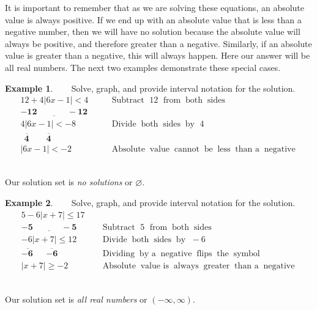 \documentclass[12pt]{book}
\theoremstyle{definition}
\newtheorem{example}{Example}
\newcommand{\tmmathbf}[1]{\ensuremath{\boldsymbol{#1}}}
\newcommand{\tmop}[1]{\ensuremath{\operatorname{#1}}}
\begin{document}
It is important to remember that as we are solving these equations, an absolute value is always positive. If we end up with an absolute value that is less than a negative number, then we will have no solution because the absolute value will always be positive, and therefore greater than a negative. Similarly, if an absolute value is greater than a negative, this will always happen. Here our answer will be all real numbers.  The next two examples demonstrate these special cases.
\begin{example}\label{106}~~~ Solve, graph, and provide interval notation for the solution.
  \begin{eqnarray*}
    12 + 4 |6x - 1| < 4~~~~ &  & \tmop{Subtract~} 12 \tmop{~from} \tmop{both}
    \tmop{sides}\\
    \tmmathbf{\underline{- 12 ~~~~~~~~~~~~~~~~- 12}} &  & \\
    4 |6x - 1| < - 8~~~~ &  & \tmop{Divide} \tmop{both} \tmop{sides} \tmop{by~} 4\\
    \tmmathbf{\overline{~~4~~} ~~~~~~ \overline{~4~}}~~~~ &  & \\
    |6x - 1| < - 2~~~~ &  & \tmop{Absolute} \tmop{value} \tmop{cannot} \tmop{be}
    \tmop{less} \tmop{than~a} \tmop{negative}
  \end{eqnarray*}
\begin{center}
\\
Our solution set is {\it no solutions} or $\varnothing$.
\end{center}
\end{example}
\begin{example}\label{Lin107}~~~ Solve, graph, and provide interval notation for the solution.
  \begin{eqnarray*}
    5 - 6 |x + 7| \leq 17~ &  &\\
    \tmmathbf{\underline{- 5 ~~~~~~~~~~~~~~~- 5}} &  &  \tmop{Subtract~} 5 \tmop{~from} \tmop{both} \tmop{sides}\\
    - 6 |x + 7| \leq 12~ &  & \tmop{Divide} \tmop{both} \tmop{sides}
    \tmop{by~} - 6\\
    \tmmathbf{\overline{- 6~} ~~~~~~ \overline{- 6}} &  & \tmop{Dividing} \tmop{by~a}
    \tmop{negative} \tmop{flips} \tmop{the} \tmop{symbol}\\
    |x + 7| \geq - 2~ &  & \tmop{Absolute} \tmop{value~is} \tmop{always}
    \tmop{greater} \tmop{than~a} \tmop{negative}
  \end{eqnarray*}
\begin{center}
\\
Our solution set is {\it all real numbers} or $(-\infty,\infty)$.
\end{center}
\end{example}
\end{document}
